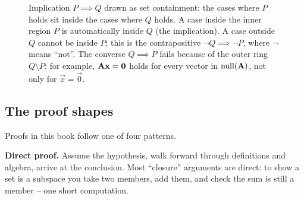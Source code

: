\begin{figure}[H]
\centering
{}
\caption{Implication $P \implies Q$ drawn as set containment: the cases where $P$ holds
sit inside the cases where $Q$ holds. A case inside the inner region $P$ is automatically
inside $Q$ (the implication). A case outside $Q$ cannot be inside $P$; this is the
contrapositive $\neg Q \implies \neg P$, where $\neg$ means ``not''. The converse
$Q \implies P$ fails because of the outer ring $Q \setminus P$: for example,
$\mathbf{A}\mathbf{x} = \mathbf{0}$ holds for every vector in $\operatorname{null}(\mathbf{A})$, not only for
$\vec{x} = \vec{0}$.}
\label{ch38:implication}
\end{figure}

\subsection{The proof shapes}

Proofs in this book follow one of four patterns.

\textbf{Direct proof.} Assume the hypothesis, walk forward through definitions and
algebra, arrive at the conclusion. Most ``closure'' arguments are direct: to show a set is
a subspace you take two members, add them, and check the sum is still a member -- one
short computation.

